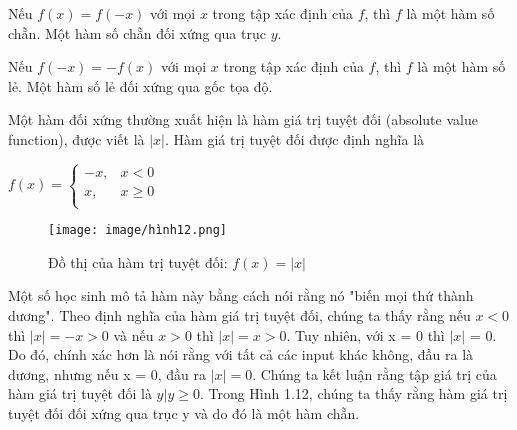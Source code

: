 \documentclass[a4paper,12pt,openany]{book}
\newcommand{\abs}[1]{\left| #1 \right|} %
\begin{document}
\clearpage

\begin{tcolorbox}[
    colframe=blue!10,      %
    colback=blue!5,    %
    coltitle=black,     %
    fonttitle=\bfseries,%
    title=Định nghĩa    %
    ]
Nếu $f(x) = f(-x)$ với mọi $x$ trong tập xác định của $f$, thì $f$ là một hàm số chẵn. Một hàm số chẵn đối xứng qua trục $y$.
\par
\vspace{10pt}
Nếu $f(-x) = -f(x)$ với mọi $x$ trong tập xác định của $f$, thì $f$ là một hàm số lẻ. Một hàm số lẻ đối xứng qua gốc tọa độ.
\end{tcolorbox}
\vspace{10pt}
Một hàm đối xứng thường xuất hiện là hàm giá trị tuyệt đối (absolute value function), được viết là \(\abs{x}\). Hàm giá trị tuyệt đối được định nghĩa là

\begin{center}
     $f(x) =
 \begin{cases}
      -x, & x < 0 \\
      x, & x \geq 0 \\
 \end{cases}$
\end{center}

\begin{figure}[H]
    \centering
    \texttt{[image: image/hình12.png]}
    \caption{Đồ thị của hàm trị tuyệt đối: $f(x) = \abs{x}$ }
    \label{fig:enter-label}
\end{figure}

Một số học sinh mô tả hàm này bằng cách nói rằng nó "biến mọi thứ thành dương". Theo định nghĩa của hàm giá trị tuyệt đối, chúng ta thấy rằng nếu $x < 0$ thì $|x| = -x > 0$ và nếu $x > 0$ thì $|x| = x > 0$. Tuy nhiên, với x = 0 thì $|x|$ = 0. Do đó, chính xác hơn là nói rằng với tất cả các input khác không, đầu ra là dương, nhưng nếu x = 0, đầu ra $|x| = 0$. Chúng ta kết luận rằng tập giá trị của hàm giá trị tuyệt đối là ${y | y ≥ 0}$. Trong Hình 1.12, chúng ta thấy rằng hàm giá trị tuyệt đối đối xứng qua trục y và do đó là một hàm chẵn.
\end{document}
